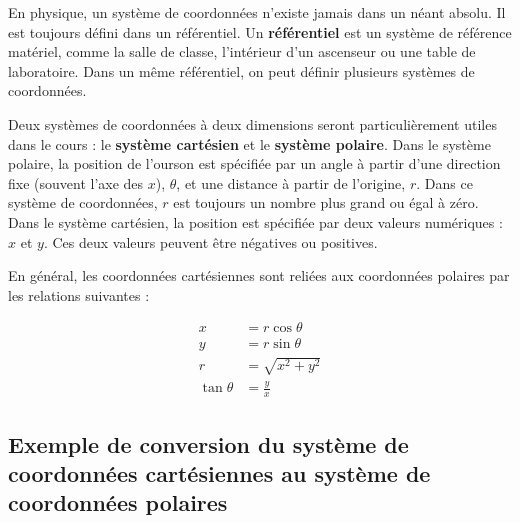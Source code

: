 En physique, un système de coordonnées n'existe jamais dans un néant absolu.
Il est toujours défini dans un référentiel.  Un \textbf{référentiel} est un
système de référence matériel, comme la salle de classe, l'intérieur d'un
ascenseur ou une table de laboratoire.  Dans un même référentiel, on peut
définir plusieurs systèmes de coordonnées.
\begin{marginfigure}
\end{marginfigure}

Deux systèmes de coordonnées à deux dimensions seront particulièrement utiles
dans le cours : le \textbf{système cartésien} et le \textbf{système polaire}.
Dans le système polaire, la position de l'ourson est spécifiée par un angle à
partir d'une direction fixe (souvent l'axe des $x$), $\theta$, et une distance
à partir de l'origine, $r$.  Dans ce système de coordonnées, $r$ est toujours
un nombre plus grand ou égal à zéro.  Dans le système cartésien, la position
est spécifiée par deux valeurs numériques : $x$ et $y$.  Ces deux valeurs
peuvent être négatives ou positives.

En général, les coordonnées cartésiennes sont reliées aux coordonnées polaires
par les relations suivantes :

\begin{align*}
  x &= r\cos\theta \\
  y &= r\sin\theta \\
  r &= \sqrt{x^2 + y^2} \\
  \tan\theta &= \frac{y}{x}
\end{align*}

\subsection{Exemple de conversion du système de coordonnées cartésiennes au
  système de coordonnées polaires}

